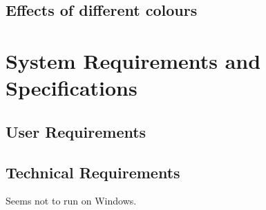 \documentclass[12pt,a4paper]{article}
\begin{document}
\subsection{Effects of different colours}





%
%
%
%
%
%
%
%
\newpage
\section{System Requirements and Specifications} \label{section:requirements}




\subsection{User Requirements}


\subsection{Technical Requirements}

Seems not to run on Windows.





%
%
%
%
%
%
%
%
\newpage
\end{document}
